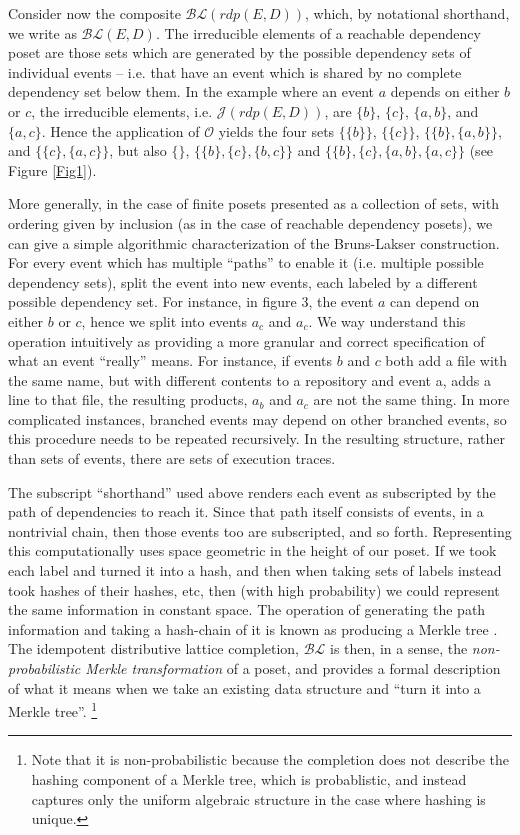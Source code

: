 \documentclass[a4paper,USenglish,cleveref, autoref, thm-restate,authorcolumns]{lipics-v2019}
\newcommand{\Oc}{\mathcal{O}}
\newcommand{\Jc}{\mathcal{J}}
\newcommand{\BLc}{\mathcal{BL}}
\begin{document}
Consider now the composite \(\BLc(rdp(E,D))\), which, by notational shorthand, we write as \(\BLc(E,D)\). The irreducible elements of a reachable dependency poset are those sets which are generated by the possible dependency sets of individual events -- i.e. that have an event which is shared by no complete dependency set below them. In the example where an event \(a\) depends on either \(b\) or \(c\), the irreducible elements, i.e. \(\Jc(rdp(E,D))\), are \(\{b\}\), \(\{c\}\), \(\{a,b\}\), and \(\{a,c\}\). Hence the application of \(\Oc\) yields the four sets \(\{\{b\}\}\), \(\{\{c\}\}\), \(\{\{b\},\{a,b\}\}\), and \(\{\{c\},\{a,c\}\}\), but also \(\{\}\), \(\{\{b\},\{c\},\{b,c\}\}\) and \(\{\{b\},\{c\},\{a,b\},\{a,c\}\}\) (see Figure \ref{Fig1}).

More generally, in the case of finite posets presented as a collection of sets, with ordering given by inclusion (as in the case of reachable dependency posets), we can give a simple algorithmic characterization of the Bruns-Lakser construction. For every event which has multiple ``paths'' to enable it (i.e. multiple possible dependency sets), split the event into new events, each labeled by a different possible dependency set. For instance, in figure 3,
the event \(a\) can depend on either \(b\) or \(c\), hence we split into events \(a_c\) and \(a_c\).  We way
understand this operation intuitively as providing a more granular and correct specification
of what an event ``really'' means.  For instance, if events \(b\) and \(c\) both add a file with the
same name, but with different contents to a repository and event a, adds a line to that file,
the resulting products, \(a_b\) and \(a_c\) are not the same thing.  In more complicated instances,
branched events may depend on other branched events, so this procedure needs to be repeated
recursively. In the resulting structure, rather than sets of events, there are sets of
execution traces.

The subscript ``shorthand'' used above renders each event as subscripted by the path of dependencies to reach it. Since that path itself consists of events, in a nontrivial chain, then those events too are subscripted, and so forth. Representing this computationally uses space geometric in the height of our poset. If we took each label and turned it into a hash, and then when taking sets of labels instead took hashes of their hashes, etc, then (with high probability) we could represent the same information in constant space. The operation of generating the path information and taking a hash-chain of it is known as producing a Merkle tree \cite{merkle1987digital}.  The idempotent distributive lattice completion, \(\BLc\) is then, in a sense,  the \textit{non-probabilistic Merkle transformation} of a poset, and provides a formal description of what it means when we take an existing data structure and ``turn it into a Merkle tree''. \footnote{Note that it is non-probabilistic because the completion does not describe the hashing component of a Merkle tree, which is probablistic, and instead captures only the uniform algebraic structure in the case where hashing is unique.} 
\end{document}
